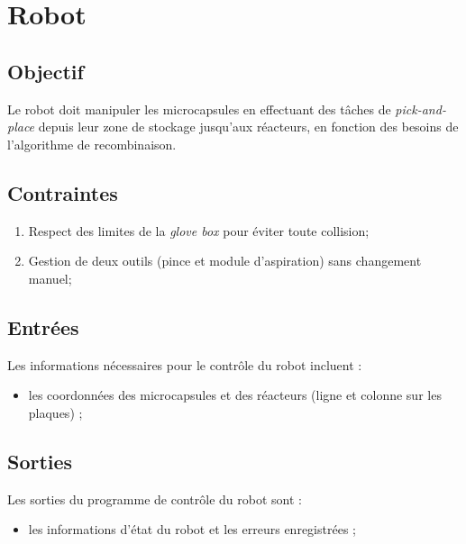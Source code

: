 \section{Robot}

\subsection{Objectif}
Le robot doit manipuler les microcapsules en effectuant des tâches de \textit{pick-and-place} depuis leur zone de stockage jusqu’aux réacteurs, en fonction des besoins de l'algorithme de recombinaison.

\subsection{Contraintes}
\begin{enumerate}
    \item Respect des limites de la \textit{glove box} pour éviter toute collision;
    \item Gestion de deux outils (pince et module d'aspiration) sans changement manuel;
\end{enumerate}

\subsection{Entrées}
Les informations nécessaires pour le contrôle du robot incluent :
\begin{itemize}
    \item les coordonnées des microcapsules et des réacteurs (ligne et colonne sur les plaques) ;
\end{itemize}

\subsection{Sorties}
Les sorties du programme de contrôle du robot sont :
\begin{itemize}
    \item les informations d'état du robot et les erreurs enregistrées ;
\end{itemize}

